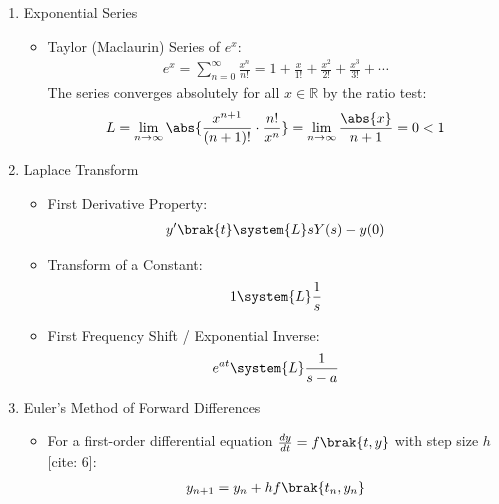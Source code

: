 \begin{enumerate}[label=\thesubsection.\arabic*, ref=\thesubsection.\theenumi]

\item Exponential Series
\begin{itemize}
\item Taylor (Maclaurin) Series of $e^x$:
\begin{align}
e^x = \sum_{n=0}^{\infty} \frac{x^n}{n!} = 1 + \frac{x}{1!} + \frac{x^2}{2!} + \frac{x^3}{3!} + \cdots \label{eq:exp_maclaurin}
\end{align}
The series converges absolutely for all $x \in \mathbb{R}$ by the ratio test:
\begin{align}
L = \lim_{n \to \infty} \abs{\frac{x^{n+1}}{(n+1)!} \cdot \frac{n!}{x^n}} = \lim_{n \to \infty} \frac{\abs{x}}{n+1} = 0 < 1
\end{align}
\end{itemize}

\item Laplace Transform
\begin{itemize}
\item First Derivative Property:
\begin{align}
y'\brak{t} \system{L} sY(s) - y(0) \label{eq:laplace_first_deriv}
\end{align}
\item Transform of a Constant:
\begin{align}
1 \system{L} \frac{1}{s} \label{eq:laplace_const}
\end{align}
\item First Frequency Shift / Exponential Inverse:
\begin{align}
e^{at} \system{L} \frac{1}{s - a} \label{eq:laplace_exp_inv}
\end{align}
\end{itemize}

\item Euler's Method of Forward Differences
\begin{itemize}
\item For a first-order differential equation $\frac{dy}{dt} = f\brak{t, y}$ with step size $h$[cite: 6]:
\begin{align}
y_{n+1} = y_n + h f\brak{t_n, y_n} \label{eq:euler_recurrence}
\end{align}
\end{itemize}


\end{enumerate}
